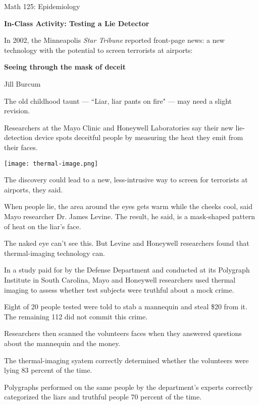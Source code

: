 \documentclass{article}
\begin{document}
\pagestyle{empty}
\centerline{\Large \sffamily Math 125: Epidemiology}

\bigskip

\centerline{\Large \sffamily \bfseries In-Class Activity: Testing a Lie Detector}

\vspace*{.25in}

\noindent In 2002, the Minneapolis {\em Star Tribune} reported front-page news: a new technology with the potential to screen terrorists at airports:

\bigskip

\centerline{\Large \bf Seeing through the mask of deceit}

\begin{multicols}{2}
\noindent Jill Burcum


\bigskip

The old childhood taunt --- ``Liar, liar pants on fire" --- may need a slight revision.

Researchers at the Mayo Clinic and Honeywell Laboratories say their new lie-detection device spots deceitful people by measuring the heat they emit from their faces.

\centerline{\texttt{[image: thermal-image.png]}}

The discovery could lead to a new, less-intrusive way to screen for terrorists at airports, they said.

When people lie, the area around the eyes gets warm while the cheeks cool, said Mayo researcher Dr. James Levine. The result, he said, is a mask-shaped pattern of heat on the liar's face.

The naked eye can't see this. But Levine and Honeywell researchers found that thermal-imaging technology can.

In a study paid for by the Defense Department and conducted at its Polygraph Institute in South Carolina, Mayo and Honeywell researchers used thermal imaging to assess whether test subjects were truthful about a mock crime.

Eight of 20 people tested were told to stab a mannequin and steal \$20 from it.  The remaining 112 did not commit this crime.

Researchers then scanned the volunteers faces when they answered questions about the mannequin and the money.

The thermal-imaging syatem correctly determined whether the volunteers were lying 83 percent of the time.

Polygraphs performed on the same people by the department's experts correctly categorized the liars and truthful people 70 percent of the time.


\end{multicols}
\end{document}
